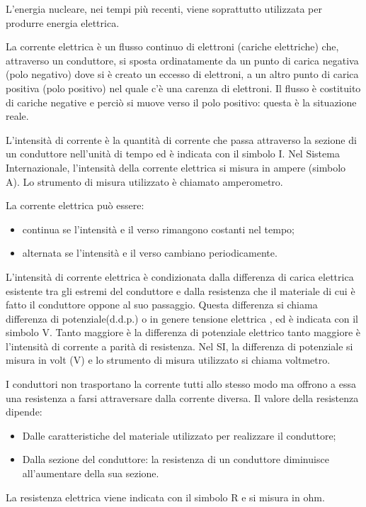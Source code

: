 L’energia nucleare, nei tempi più recenti, viene soprattutto utilizzata per produrre energia elettrica.

La corrente elettrica è un flusso continuo di elettroni (cariche elettriche) che, attraverso un conduttore, si sposta ordinatamente da un punto di carica negativa (polo negativo) dove si è creato un eccesso di elettroni, a un altro punto di carica positiva (polo positivo) nel quale c’è una carenza di elettroni. Il flusso è costituito di cariche negative e perciò si muove verso il polo positivo: questa è la situazione reale.

L’intensità di corrente è la quantità di corrente che passa attraverso la sezione di un conduttore nell’unità di tempo ed è indicata con il simbolo I. Nel Sistema Internazionale, l’intensità della corrente elettrica si misura in ampere (simbolo A). Lo strumento di misura utilizzato è chiamato amperometro.

La corrente elettrica può essere:
\begin{itemize}
  \item continua se l’intensità e il verso rimangono costanti nel tempo;
  \item alternata se l’intensità e il verso cambiano periodicamente.
\end{itemize}

L’intensità di corrente elettrica è condizionata dalla differenza di carica elettrica esistente tra gli estremi del conduttore e dalla resistenza che il materiale di cui è fatto il conduttore oppone al suo passaggio. Questa differenza si chiama differenza di potenziale(d.d.p.) o in genere tensione elettrica , ed è indicata con il simbolo V. Tanto maggiore è la differenza di potenziale elettrico tanto maggiore è l’intensità di corrente a parità di resistenza. Nel SI, la differenza di potenziale si misura in volt (V) e lo strumento di misura utilizzato si chiama voltmetro.

I conduttori non trasportano la corrente tutti allo stesso modo ma offrono a essa una resistenza a farsi attraversare dalla corrente diversa. Il valore della resistenza dipende:
\begin{itemize}
  \item Dalle caratteristiche del materiale utilizzato per realizzare il conduttore;
  \item Dalla sezione del conduttore: la resistenza di un conduttore diminuisce all’aumentare della sua sezione.
\end{itemize}
La resistenza elettrica viene indicata con il simbolo R e si misura in ohm.

